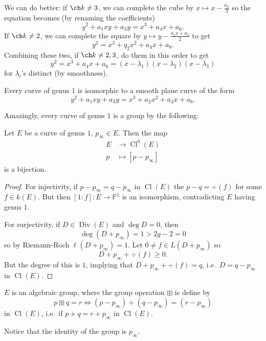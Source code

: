\documentclass[a4paper]{article}
\DeclareMathOperator{\Cl}{Cl}
\renewcommand*{\P}{\mathbb{P}}
\DeclareMathOperator{\Div}{Div} %
\begin{document}
We can do better: if \(\ch k \neq 3\), we can complete the cube by \(x \mapsto x - \frac{a_2}{3}\) so the equation becomes (by renaming the coefficients)
\[
  y^2 + a_1xy + a_3y = x^3 + a_4x + a_6.
\]
If \(\ch k \neq 2\), we can complete the square by \(y \mapsto y - \frac{a_1x + a_3}{2}\) to get
\[
  y^2 = x^3 + q_2x^2 + a_4x + a_6.
\]
Combining these two, if \(\ch k \neq 2, 3\), do them in this order to get
\[
  y^2 = x^3 + a_4x + a_6 = (x - \lambda_1)(x - \lambda_2)(x - \lambda_3)
\]
for \(\lambda_i\)'s distinct (by smoothness).

\begin{theorem}
  Every curve of genus \(1\) is isomorphic to a smooth plane curve of the form
  \[
    y^2 + a_1xy + a_3y = x^3 + a_2x^2 + a_4x + a_6.
  \]
\end{theorem}

Amazingly, every curve of genus \(1\) is a group by the following:
\begin{proposition}
  Let \(E\) be a curve of genus \(1\), \(p_\infty \in E\). Then the map
  \begin{align*}
    E &\to \Cl^0(E) \\
    p &\mapsto [p - p_\infty]
  \end{align*}
  is a bijection.
\end{proposition}

\begin{proof}
  For injectivity, if \(p - p_\infty = q - p_\infty\) in \(\Cl(E)\) the \(p - q = \div (f)\) for some \(f \in k(E)\). But then \([1:f]: E \to \P^1\) is an isomorphism, contradicting \(E\) having genus \(1\).

  For surjectivity, if \(D \in \Div(E)\) and \(\deg D = 0\), then
  \[
    \deg(D + p_\infty) = 1 > 2g - 2 = 0
  \]
  so by Riemann-Roch \(\ell(D + p_\infty) = 1\). Let \(0 \neq f \in L(D + p_\infty)\) so
  \[
    D + p_\infty + \div (f) \geq 0.
  \]
  But the degree of this is \(1\), implying that \(D + p_\infty + \div(f) = q\), i.e.\ \(D = q - p_\infty\) in \(\Cl(E)\).
\end{proof}

\begin{corollary}
  \(E\) is an algebraic group, where the group operation \(\boxplus\) is define by
  \[
    p \boxplus q = r \iff (p - p_\infty) + (q - p_\infty) = (r - p_\infty)
  \]
  in \(\Cl(E)\), i.e.\ if \(p + q = r + p_\infty\) in \(\Cl(E)\).
\end{corollary}
Notice that the identity of the group is \(p_\infty\).
\end{document}
